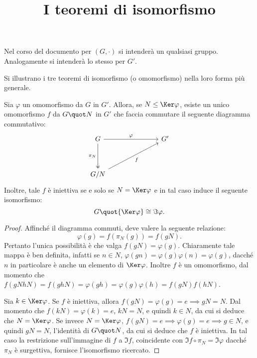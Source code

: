 \documentclass[12pt]{scrartcl}
\begin{document}
	\title{I teoremi di isomorfismo}
	\maketitle
	
	\begin{note}
		Nel corso del documento per $(G, \cdot)$ si intenderà un qualsiasi gruppo. Analogamente si intenderà lo stesso per
		$G'$.
	\end{note}
	
	Si illustrano i tre teoremi di isomorfismo (o omomorfismo)
	nella loro forma più generale.
	
	\begin{theorem}
		Sia $\varphi$ un omomorfismo da $G$ in $G'$. Allora,
		se $N \leq \Ker \varphi$, esiste un unico omomorfismo
		$f$ da $G \quot N$ in $G'$ che faccia commutare il
		seguente diagramma commutativo:
		\[\begin{tikzcd}
			G &&& {G'} \\
			\\
			{G/N}
			\arrow["{\pi_N}"', two heads, from=1-1, to=3-1]
			\arrow["\varphi", from=1-1, to=1-4]
			\arrow["f"', from=3-1, to=1-4]
		\end{tikzcd}\]
		Inoltre, tale $f$ è iniettiva se e solo se $N = \Ker \varphi$
		e in tal caso induce il seguente isomorfismo:
		\[ G \quot {\Ker \varphi} \cong \Im \varphi. \]
	\end{theorem}
	
	\begin{proof}
		Affinché il diagramma commuti, deve valere la seguente
		relazione:
		\[ \varphi(g) = f(\pi_N(g)) = f(gN). \]
		Pertanto l'unica possibilità è che valga $f(gN) = \varphi(g)$.
		Chiaramente tale mappa è ben definita, infatti se $n \in N$,
		$\varphi(gn) = \varphi(g) \varphi(n) = \varphi(g)$, dacché
		$n$ in particolare è anche un elemento di $\Ker \varphi$.
		Inoltre $f$ è un omomorfismo, dal momento che
		$f(gN hN) = f(ghN) = \varphi(gh) = \varphi(g) \varphi(h) =
		f(gN) f(hN)$. \medskip
		
		
		Sia $k \in \Ker \varphi$. Se $f$ è iniettiva, allora $f(gN) = \varphi(g) = e \implies gN = N$. Dal momento che
		$f(kN) = \varphi(k) = e$, $kN = N$, e quindi $k \in N$,
		da cui si deduce che $N = \Ker \varphi$. Se invece
		$N = \Ker \varphi$, $f(gN) = e \implies \varphi(g) = e \implies g \in N$, e quindi $gN = N$, l'identità di
		$G \quot N$, da cui si deduce che $f$ è iniettiva. In tal
		caso la restrizione sull'immagine di $f$ a
		$\Im f$, coincidente con $\Im f \circ \pi_N = \Im \varphi$
		dacché $\pi_N$ è surgettiva, fornisce l'isomorfismo
		ricercato. 
	\end{proof}
	
\end{document}
